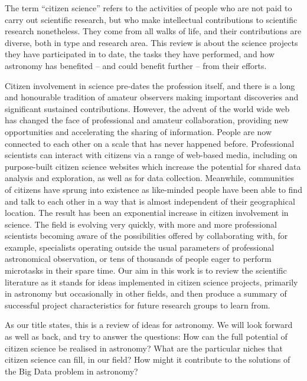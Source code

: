 \documentclass{ar2e}
\begin{document}
The term ``citizen science'' refers to the activities of people who are not paid
to carry out scientific research, but who make intellectual
contributions to scientific research nonetheless. They come from all
walks of life, and their contributions are diverse, both in type and research
area. This review is about the science projects they have participated in to
date, the tasks they have performed, and how astronomy has benefited -- and
could benefit further -- from their efforts.

Citizen involvement in science pre-dates the profession itself, and there is a
long and honourable tradition of amateur observers making important discoveries
and significant sustained contributions.  However, the advent of the
world wide web has changed the face of professional and amateur collaboration,
providing new opportunities and accelerating the sharing of information. People
are now connected to each other on a scale that has never happened before.
Professional scientists can interact with citizens via a range of web-based
media, including on purpose-built citizen science websites which increase the
potential for shared data analysis and exploration, as well as for data
collection. Meanwhile, communities of citizens have sprung into existence as
like-minded people have been able to find and talk to each other in a way that
is almost independent of their geographical location. The result has been an
exponential increase in citizen involvement in science. The field is evolving
very quickly, with more and more professional scientists becoming aware of the
possibilities offered by collaborating with, for example, specialists operating
outside the usual parameters of professional astronomical observation, or tens
of thousands of people eager to perform microtasks in their spare time.  Our aim
in this work is to review the scientific literature as it stands for ideas
implemented in citizen science projects, primarily in astronomy but occasionally
in other fields, and then produce a summary of successful project
characteristics for future research groups to learn from.

As our title states, this is a review of ideas for astronomy. We will look
forward as well as back, and try to answer the questions: How can the full
potential of citizen science be realised in astronomy? What are the particular
niches that citizen science can fill, in our field? How might it contribute to
the solutions of the Big Data problem in astronomy?
\end{document}

